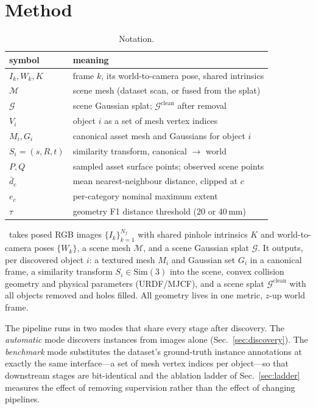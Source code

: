 \section{Method}

\ifextended
\begin{table}[t]
\caption{Notation.}
\label{tab:notation}
\centering\small
\begin{tabular}{ll}
\toprule
symbol & meaning \\
\midrule
$I_k, W_k, K$ & frame $k$, its world-to-camera pose, shared intrinsics \\
$\mathcal{M}$ & scene mesh (dataset scan, or fused from the splat) \\
$\mathcal{G}$ & scene Gaussian splat; $\mathcal{G}^{\text{clean}}$ after removal \\
$V_i$ & object $i$ as a set of mesh vertex indices \\
$M_i, G_i$ & canonical asset mesh and Gaussians for object $i$ \\
$S_i=(s,R,t)$ & similarity transform, canonical $\to$ world \\
$P, Q$ & sampled asset surface points; observed scene points \\
$\bar{d}_c$ & mean nearest-neighbour distance, clipped at $c$ \\
$e_c$ & per-category nominal maximum extent \\
$\tau$ & geometry F1 distance threshold (20 or 40\,mm) \\
\bottomrule
\end{tabular}
\end{table}
\fi


\name\ takes posed RGB images $\{I_k\}_{k=1}^{N_f}$ with shared pinhole
intrinsics $K$ and world-to-camera poses $\{W_k\}$, a scene mesh
$\mathcal{M}$, and a scene Gaussian splat $\mathcal{G}$. It outputs, per discovered object $i$: a
textured mesh $M_i$ and Gaussian set $G_i$ in a canonical frame, a
similarity transform $S_i \in \mathrm{Sim}(3)$ into the scene, convex
collision geometry and physical parameters (URDF/MJCF), and a scene splat
$\mathcal{G}^{\text{clean}}$ with all objects removed and holes filled.
All geometry lives in one metric, $z$-up world frame.

The pipeline runs in two modes that share every stage after discovery.
The \emph{automatic} mode discovers instances from images alone
(Sec.~\ref{sec:discovery}). The \emph{benchmark} mode substitutes the
dataset's ground-truth instance annotations at exactly the same
interface---a set of mesh vertex indices per object---so that downstream
stages are bit-identical and the ablation ladder of
Sec.~\ref{sec:ladder} measures the effect of removing supervision rather
than the effect of changing pipelines.


